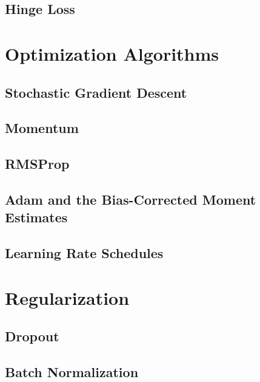 \subsection{Hinge Loss}

\section{Optimization Algorithms}
\label{sec:optimizers}

\subsection{Stochastic Gradient Descent}

\subsection{Momentum}

\subsection{RMSProp}

\subsection{Adam and the Bias-Corrected Moment Estimates}

\subsection{Learning Rate Schedules}

\section{Regularization}
\label{sec:regularization}

\subsection{Dropout}

\subsection{Batch Normalization}


